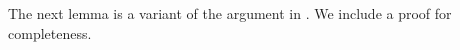 \documentclass[12pt]{amsart}
\theoremstyle{plain}
\theoremstyle{definition}
\numberwithin{equation}{section}
\begin{document}






The next lemma is a variant of the argument in \cite[Section~2.1]{DR_hardy}. We include a proof for completeness.
\end{document}

